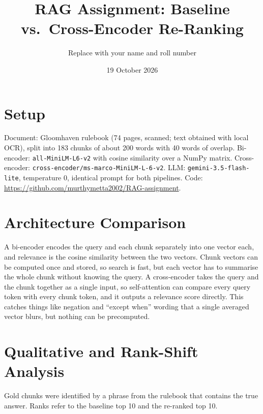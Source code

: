 ﻿\documentclass[11pt]{article}
\title{RAG Assignment: Baseline vs.\ Cross-Encoder Re-Ranking}
\author{Replace with your name and roll number}
\date{19 October 2026}
\begin{document}
\maketitle

\section*{Setup}
Document: Gloomhaven rulebook (74 pages, scanned; text obtained with local OCR), split into 183 chunks of about 200 words with 40 words of overlap. Bi-encoder: \texttt{all-MiniLM-L6-v2} with cosine similarity over a NumPy matrix. Cross-encoder: \texttt{cross-encoder/ms-marco-MiniLM-L-6-v2}. LLM: \texttt{gemini-3.5-flash-lite}, temperature 0, identical prompt for both pipelines. Code: \url{https://github.com/murthymetta2002/RAG-assignment}.

\section{Architecture Comparison}
A bi-encoder encodes the query and each chunk separately into one vector each, and relevance is the cosine similarity between the two vectors. Chunk vectors can be computed once and stored, so search is fast, but each vector has to summarise the whole chunk without knowing the query. A cross-encoder takes the query and the chunk together as a single input, so self-attention can compare every query token with every chunk token, and it outputs a relevance score directly. This catches things like negation and ``except when'' wording that a single averaged vector blurs, but nothing can be precomputed.

\section{Qualitative and Rank-Shift Analysis}
Gold chunks were identified by a phrase from the rulebook that contains the true answer. Ranks refer to the baseline top 10 and the re-ranked top 10.
\end{document}
